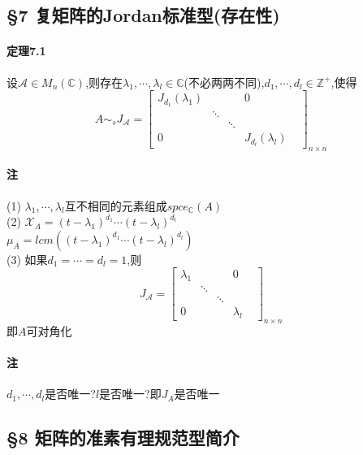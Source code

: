 \documentclass{ctexart}
\begin{document}
\subsection{§7 复矩阵的Jordan标准型(存在性)}
\paragraph{定理7.1}
设$\mathcal{A} \in M_{n}(\mathbb{C})$,则存在$\lambda_{1},\cdots,\lambda_{l} \in \mathbb{C}$(不必两两不同),$d_{1},\cdots,d_{l} \in \mathbb{Z}^{+}$,使得
$$
 A\sim_{s}J_{\mathcal{A}}=
 \left[
 \begin{matrix}
  J_{d_{1}}(\lambda_{1}) &   &   & 0 \\
    & \ddots &   &   & \\
     &   & \ddots &   &  \\
  0 &   &    & J_{d_{l}}(\lambda_{l}) 
  \end{matrix}
  \right]_{n\times n}
$$

\paragraph{注}
(1) $\lambda_{1},\cdots,\lambda_{l}$互不相同的元素组成$spce_{\mathbb{C}}(A)$\\
(2) $\mathcal{X}_{A}=(t-\lambda_{1})^{d_{1}}\cdots(t-\lambda_{l})^{d_{l}}$\\
$\mu_{A}=lcm((t-\lambda_{1})^{d_{1}}\cdots(t-\lambda_{l})^{d_{l}})$\\
(3) 如果$d_{1}=\cdots=d_{l}=1$,则
$$
 J_{\mathcal{A}}=
 \left[
 \begin{matrix}
  \lambda_{1} &   &   & 0 \\
    & \ddots &   &   & \\
     &   & \ddots &   &  \\
  0 &   &    & \lambda_{l}
  \end{matrix}
  \right]_{n\times n}
$$
即$A$可对角化

\paragraph{注}
$d_{1},\cdots,d_{l}$是否唯一?$l$是否唯一?即$J_{A}$是否唯一

\subsection{§8 矩阵的准素有理规范型简介}
\end{document}
